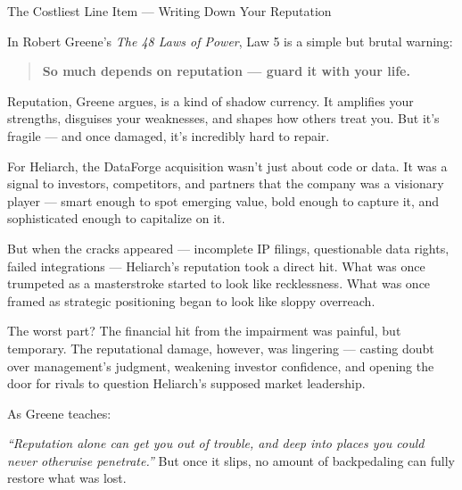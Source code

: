 \begin{HistoricalSidebar}{The Costliest Line Item --- Writing Down Your Reputation}

In Robert Greene’s \textit{The 48 Laws of Power}, Law 5 is a simple but brutal warning:

\begin{quote}
    \textbf{So much depends on reputation — guard it with your life.}
\end{quote}

Reputation, Greene argues, is a kind of shadow currency.  
It amplifies your strengths, disguises your weaknesses, and shapes how others treat you.  
But it’s fragile — and once damaged, it’s incredibly hard to repair.

\medskip

For Heliarch, the DataForge acquisition wasn’t just about code or data.  
It was a signal to investors, competitors, and partners that the company was a visionary player —  
smart enough to spot emerging value, bold enough to capture it, and sophisticated enough to capitalize on it.

\medskip

But when the cracks appeared — incomplete IP filings, questionable data rights, failed integrations —  
Heliarch’s reputation took a direct hit.  
What was once trumpeted as a masterstroke started to look like recklessness.  
What was once framed as strategic positioning began to look like sloppy overreach.

\medskip

The worst part?  
The financial hit from the impairment was painful, but temporary.  
The reputational damage, however, was lingering —  
casting doubt over management’s judgment, weakening investor confidence, and opening the door for rivals to question Heliarch’s supposed market leadership.

\medskip

As Greene teaches:  

\medskip

\textit{“Reputation alone can get you out of trouble, and deep into places you could never otherwise penetrate.”}  
But once it slips, no amount of backpedaling can fully restore what was lost.

\end{HistoricalSidebar}
